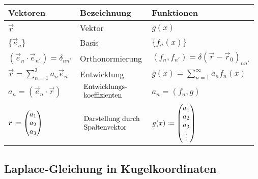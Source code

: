 

\begin{center}
	\begin{tabular*}{.9\textwidth}{@{\extracolsep{\fill}}lll}
		\hline
		Vektoren & Bezeichnung & Funktionen\\
		\hline
		$ \vec{r} $ & Vektor & $ g(x) $ \\
		$ \{\vec{e}_n\} $ & Basis & $ \{f_n(x)\} $\\
		$ (\vec{e}_n \cdot \vec{e}_{n'}) = \delta_{nn'} $ & Orthonormierung & $ (f_n, f_{n'}) = \delta(\vec{r} - \vec{r}_0)_{nn'} $\\
		${\displaystyle \vec{r} = \sum_{n=1}^{3} a_n \vec{e}_n }$ & Entwicklung & $ {\displaystyle g(x) = \sum_{n=1}^{\infty} a_n f_n(x) }$\\
		$ a_n = (\vec{e}_n \cdot \vec{r}) $ & \hspace{-8.5pt} $ \begin{array}{l}
			\textrm{Entwicklungs-}\\
			\textrm{koeffizienten}
		\end{array}$ & $ a_n = (f_n,g) $\\
		$ \vec{r} \defeq \begin{pmatrix}
		a_1 \\ a_2 \\ a_3
		\end{pmatrix} $ & \hspace{-8.5pt} $ \begin{array}{l}
		\textrm{Darstellung durch}\\
		\textrm{Spaltenvektor}
		\end{array} $ & $ g(x) \defeq \begin{pmatrix}
		a_1 \\ a_2 \\ a_3 \\ \vdots
		\end{pmatrix} $
	\end{tabular*}
\end{center}

\subsection{Laplace-Gleichung in Kugelkoordinaten}

